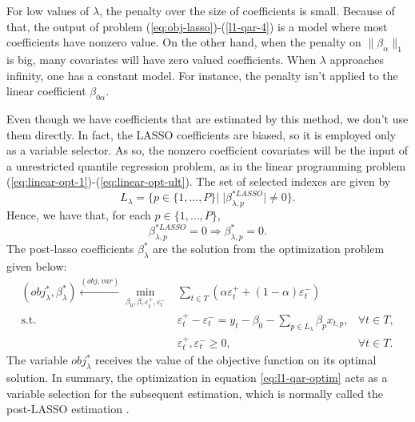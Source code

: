 For low values of $\lambda$, the penalty over the size of coefficients is small. Because of that, the output of problem (\ref{eq:obj-lasso})-(\ref{l1-qar-4}) is a model where most coefficients have nonzero value. On the other hand, when the penalty on $\| \beta_\alpha \|_1$ is big, many covariates will have zero valued coefficients. When $\lambda$ approaches infinity, one has a constant model. 
For instance, the penalty isn't applied to the linear coefficient $\beta_{0\alpha}$. 

Even though we have coefficients that are estimated by this method, we don't use them directly. In fact, the LASSO coefficients are biased, so it is employed only as a variable selector. As so, the nonzero coefficient covariates will be the input of a unrestricted quantile regression problem, as in the linear programming problem (\ref{eq:linear-opt-1})-(\ref{eq:linear-opt-ult}). 
The set of selected indexes are given by
\begin{equation*}
L_\lambda = \{ p \in \{ 1,\dots,P \} | \; |\beta^{*LASSO}_{\lambda,p}| \neq 0  \}.
\end{equation*}
Hence, we have that, for each $p \in \{ 1,\dots,P \}$,
$$\beta^{*LASSO}_{\lambda,p} = 0 \Longrightarrow \beta^{*}_{\lambda,p} = 0.$$
The post-lasso coefficients $\beta_\lambda^*$ are the solution from the optimization problem given below:
\begin{equation}
\begin{aligned} (obj_{\lambda}^{*},\beta_{\lambda}^{*})\overset{(obj,var)}{\longleftarrow} \min_{\beta_0,\beta,\varepsilon_{t}^{+},\varepsilon_{t}^{-}} & \sum_{t \in T}\left(\alpha\varepsilon_{t}^{+}+(1-\alpha)\varepsilon_{t}^{-}\right) \\
\mbox{s.t. } & \varepsilon_{t}^{+}-\varepsilon_{t}^{-}=y_{t} - \beta_0 - \sum_{p\in L_\lambda} \beta_p x_{t,p},& \forall t\in T,\\
& \varepsilon_t^+,\varepsilon_t^- \geq 0, & \forall t \in T.
\end{aligned}
\label{eq:post-lasso}
\end{equation}
The variable $obj_{\lambda}^{*}$ receives the value of the objective function on its optimal solution.
In summary, the optimization in equation \ref{eq:l1-qar-optim} acts as a variable selection for the subsequent estimation, which is normally called the post-LASSO estimation \cite{belloni2009least}.


